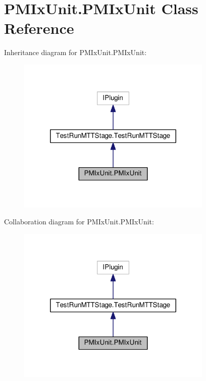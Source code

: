 \hypertarget{class_p_m_ix_unit_1_1_p_m_ix_unit}{\section{P\-M\-Ix\-Unit.\-P\-M\-Ix\-Unit Class Reference}
\label{class_p_m_ix_unit_1_1_p_m_ix_unit}
}


Inheritance diagram for P\-M\-Ix\-Unit.\-P\-M\-Ix\-Unit\-:
\nopagebreak
\begin{figure}[H]
\begin{center}
\leavevmode
\includegraphics[width=264pt]{class_p_m_ix_unit_1_1_p_m_ix_unit__inherit__graph}
\end{center}
\end{figure}


Collaboration diagram for P\-M\-Ix\-Unit.\-P\-M\-Ix\-Unit\-:
\nopagebreak
\begin{figure}[H]
\begin{center}
\leavevmode
\includegraphics[width=264pt]{class_p_m_ix_unit_1_1_p_m_ix_unit__coll__graph}
\end{center}
\end{figure}
